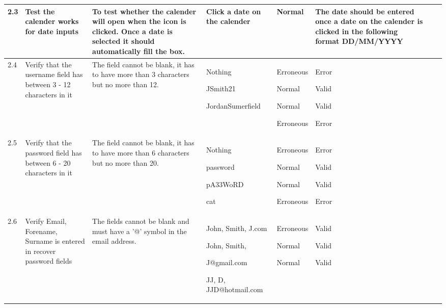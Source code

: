 \begin{landscape}
\begin{center}
\begin{longtable}{|p{1.5cm}|p{2.5cm}|p{2.5cm}|p{4cm}|p{2cm}|p{2cm}|p{1cm}|p{1cm}|}
2.3 & Test the calender works for date inputs & To test whether the calender will open when the icon is clicked. Once a date is selected it should automatically fill the box. & Click a date on the calender & Normal  & The date should be entered once a date on the calender is clicked in the following format DD/MM/YYYY && \\ \hline
2.4 & Verify that the username field has between 3 - 12 characters in it & The field cannot be blank, it has to have more than 3 characters but no more than 12. & Nothing \par \bigskip 30597 \par \bigskip JSmith21 \par \bigskip JordanSumerfield &Erroneous \par \bigskip  Normal \par \bigskip Normal \par \bigskip Erroneous & Error         \par \bigskip Valid              \par \bigskip Valid                 \par \bigskip Error && \\ \hline
2.5 & Verify that the password field has between 6 - 20 characters in it & The field cannot be blank, it has to have more than 6 characters but no more than 20. & Nothing \par password \par pA33WoRD \par cat  &Erroneous \par Normal \par Normal \par Erroneous & Error         \par Valid              \par Valid                 \par Error && \\ \hline
2.6 & Verify Email, Forename, Surname is entered in recover password fields & The fields cannot be blank and must have a '@' symbol in the email address. & John, Smith, J.com \par  \bigskip John, Smith, \par J@gmail.com \bigskip \par JJ, D, JJD@hotmail.com \par & Erroneous \par \bigskip Normal \par \bigskip \bigskip Normal &  \par Valid \par \bigskip Valid \par \bigskip \bigskip Valid&&\\ \hline

\end{longtable}
\end{center}
\end{landscape}
